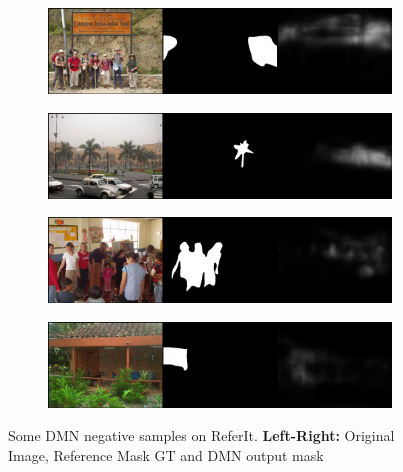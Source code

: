 \begin{figure}[!htbp]
    \centering
    \begin{subfigure}[b]{\columnwidth}
            \centering
            \includegraphics[width=\textwidth]{./figures/referit_samples/1_neg.png}
    \end{subfigure}
    
    \begin{subfigure}[b]{\columnwidth}
            \centering
            \includegraphics[width=\textwidth]{./figures/referit_samples/2_neg.png}
    \end{subfigure}
    
    \begin{subfigure}[b]{\columnwidth}
            \centering
            \includegraphics[width=\textwidth]{./figures/referit_samples/3_neg.png}
    \end{subfigure}
    
    \begin{subfigure}[b]{\columnwidth}
            \centering
            \includegraphics[width=\textwidth]{./figures/referit_samples/4_neg.png}
    \end{subfigure}
    \caption{Some DMN negative samples on ReferIt. \textbf{Left-Right:} Original Image, Reference Mask GT and DMN output mask}
    \label{Fig:Referit_Neg}
\end{figure}
\FloatBarrier
